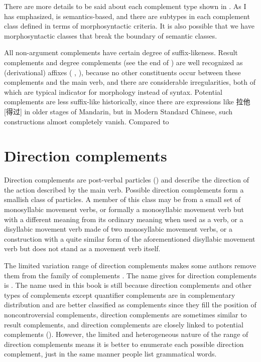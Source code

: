 \documentclass[../main.tex]{subfiles}
\begin{document}
There are more details to be said about each complement type shown in .
As I has emphasized,  is semantics-based,
and there are subtypes in each complement class
defined in terms of morphosyntactic criteria.
It is also possible that we have morphosyntactic classes that break the boundary of semantic classes.

All non-argument complements have certain degree of suffix-likeness.
Result complements and degree complements 
(see the end of ) 
are well recognized as (derivational) affixes 
(\citealt{zhudexigrammar} , \citealt{deng2010formal} ),
because no other constituents occur between these complements and the main verb, %
and there are considerable irregularities, %
both of which are typical indicator for morphology instead of syntax. %
Potential complements are less suffix-like historically, 
since there are expressions like 拉他[得过] in older stages of Mandarin,
but in Modern Standard Chinese, such constructions almost completely vanish.
Compared to 

\section{Direction complements}\label{sec:direction-complement}

Direction complements are post-verbal particles ()
and describe the direction of the action described by the main verb.
Possible direction complements form a smallish class of particles.
A member of this class may be from a small set of monosyllabic movement verbs, %
or formally a monosyllabic movement verb but with a different meaning %
from its ordinary meaning when used as a verb, 
or a disyllabic movement verb made of two monosyllabic movement verbs,
or a construction with a quite similar form of the aforementioned disyllabic movement verb 
but does not stand as a movement verb itself. 

The limited variation range of direction complements makes 
some authors remove them from the family of complements \citep[]{po2015chinese}.
The name \citet{po2015chinese} gives for direction complements is .
The name used in this book is still  because 
direction complements and other types of complements except quantifier complements 
are in complementary distribution and are better classified as complements 
since they fill the position of noncontroversial complements, 
direction complements are sometimes similar to result complements, %
and direction complements are closely linked to potential complements 
().
However, the limited and heterogeneous nature of the range of direction complements 
means it is better to enumerate each possible direction complement, 
just in the same manner people list grammatical words.
\end{document}

